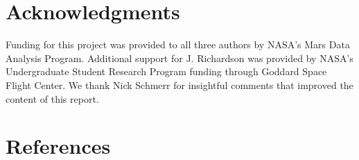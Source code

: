 \section{Acknowledgments}

Funding for this project was provided to all three authors by NASA's Mars Data Analysis Program. Additional support for J. Richardson was provided by NASA's Undergraduate Student Research Program funding through Goddard Space Flight Center. We thank Nick Schmerr for insightful comments that improved the content of this report.


\section{References}

